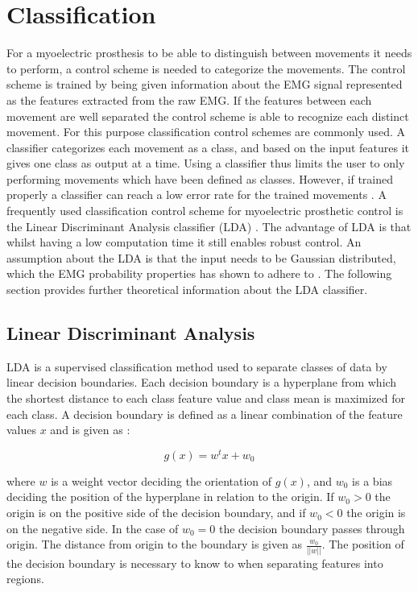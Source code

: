 \section{Classification}
For a myoelectric prosthesis to be able to distinguish between movements it needs to perform, a control scheme is needed to categorize the movements. The control scheme is trained by being given information about the EMG signal represented as the features extracted from the raw EMG. If the features between each movement are well separated the control scheme is able to recognize each distinct movement. For this purpose classification control schemes are commonly used. A classifier categorizes each movement as a class, and based on the input features it gives one class as output at a time. Using a classifier thus limits the user to only performing movements which have been defined as classes. However, if trained properly a classifier can reach a low error rate for the trained movements \cite{Scheme2013}. A frequently used classification control scheme for myoelectric prosthetic control is the Linear Discriminant Analysis classifier (LDA) \cite{Englehart2003, Scheme2015, Fang2017, Scheme2013}. The advantage of LDA is that whilst having a low computation time it still enables robust control. An assumption about the LDA is that the input needs to be Gaussian distributed, which the EMG probability properties has shown to adhere to \cite{Duda2000, Nazarpour2013}. The following section provides further theoretical information about the LDA classifier.


\subsection{Linear Discriminant Analysis}
LDA is a supervised classification method used to separate classes of data by linear decision boundaries. Each decision boundary is a hyperplane from which the shortest distance to each class feature value and class mean is maximized for each class. A decision boundary is defined as a linear combination of the feature values $x$ and is given as \cite{Duda2000}:

\begin{equation}
g(x) = w^tx +w_0
\end{equation}

where $w$ is a weight vector deciding the orientation of $g(x)$, and $w_0$ is a bias deciding the position of the hyperplane in relation to the origin. If $w_0 > 0$ the origin is on the positive side of the decision boundary, and if $w_0 < 0$ the origin is on the negative side. In the case of $w_0 = 0$ the decision boundary passes through origin. The distance from origin to the boundary is given as $\frac{w_0}{||w||}$. The position of the decision boundary is necessary to know to when separating features into regions. \cite{Duda2000}

